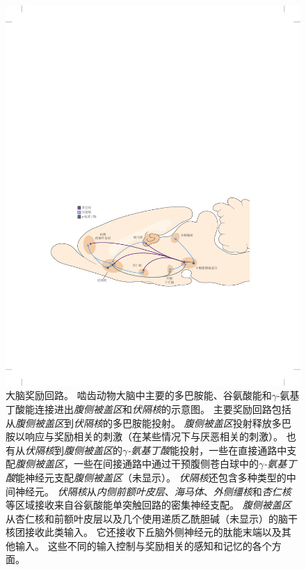 \begin{figure}[htbp]
	\centering
	\includegraphics[width=0.95\linewidth]{chap43/fig_43_3}
	\caption{大脑奖励回路。
		啮齿动物大脑中主要的多巴胺能、谷氨酸能和$\gamma$-氨基丁酸能连接进出\textit{腹侧被盖区}和\textit{伏隔核}的示意图。
		主要奖励回路包括从\textit{腹侧被盖区}到\textit{伏隔核}的多巴胺能投射。
		\textit{腹侧被盖区}投射释放多巴胺以响应与奖励相关的刺激（在某些情况下与厌恶相关的刺激）。
		也有从\textit{伏隔核}到\textit{腹侧被盖区}的\textit{$\gamma$-氨基丁酸}能投射，一些在直接通路中支配\textit{腹侧被盖区}，一些在间接通路中通过干预腹侧苍白球中的\textit{$\gamma$-氨基丁酸}能神经元支配\textit{腹侧被盖区}（未显示）。
		\textit{伏隔核}还包含多种类型的中间神经元。
		\textit{伏隔核}从\textit{内侧前额叶皮层}、\textit{海马体}、\textit{外侧缰核}和\textit{杏仁核}等区域接收来自谷氨酸能单突触回路的密集神经支配。
		\textit{腹侧被盖区}从杏仁核和前额叶皮层以及几个使用递质乙酰胆碱（未显示）的脑干核团接收此类输入。
		它还接收下丘脑外侧神经元的肽能末端以及其他输入。
		这些不同的输入控制与奖励相关的感知和记忆的各个方面\cite{russo2013brain}。}
	\label{fig:43_3}
\end{figure}



